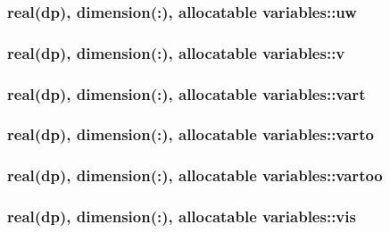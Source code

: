 \hypertarget{classvariables_a5c939ce1a06535507aa593fc8afdd33e}{
\subsubsection[{uw}]{\setlength{\rightskip}{0pt plus 5cm}real(dp), dimension(\-:), allocatable variables\-::uw}}\label{classvariables_a5c939ce1a06535507aa593fc8afdd33e}
\hypertarget{classvariables_a86b6b89bf878f32443ca5fec75e65ad3}{
\subsubsection[{v}]{\setlength{\rightskip}{0pt plus 5cm}real(dp), dimension(\-:), allocatable variables\-::v}}\label{classvariables_a86b6b89bf878f32443ca5fec75e65ad3}
\hypertarget{classvariables_a00a6536ca0a27051d610b66a2d8d11ac}{
\subsubsection[{vart}]{\setlength{\rightskip}{0pt plus 5cm}real(dp), dimension(\-:), allocatable variables\-::vart}}\label{classvariables_a00a6536ca0a27051d610b66a2d8d11ac}
\hypertarget{classvariables_afc0fa9dbdf81c0a52f1559984dc3c4c0}{
\subsubsection[{varto}]{\setlength{\rightskip}{0pt plus 5cm}real(dp), dimension(\-:), allocatable variables\-::varto}}\label{classvariables_afc0fa9dbdf81c0a52f1559984dc3c4c0}
\hypertarget{classvariables_ad3200e0111fea315c6ab22914a587b73}{
\subsubsection[{vartoo}]{\setlength{\rightskip}{0pt plus 5cm}real(dp), dimension(\-:), allocatable variables\-::vartoo}}\label{classvariables_ad3200e0111fea315c6ab22914a587b73}
\hypertarget{classvariables_ac469ba5672674935b4d3faa619ea51e5}{
\subsubsection[{vis}]{\setlength{\rightskip}{0pt plus 5cm}real(dp), dimension(\-:), allocatable variables\-::vis}}\label{classvariables_ac469ba5672674935b4d3faa619ea51e5}
